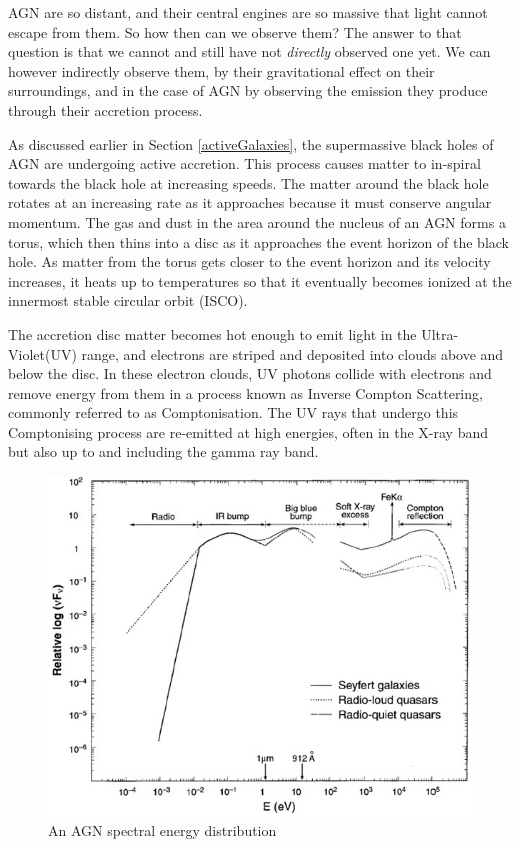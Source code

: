 \documentclass[12pt, oneside]{smuthesis}
\begin{document}
AGN are so distant, and their central engines are so massive that light cannot escape from them. So how then can we observe them? The answer to that question is that we cannot and still have not \textit{directly} observed one yet. We can however indirectly observe them, by their gravitational effect on their surroundings, and in the case of AGN by observing the emission they produce through their accretion process.

As discussed earlier in Section \ref{activeGalaxies}, the supermassive black holes of AGN are undergoing active accretion. This process causes matter to in-spiral towards the black hole at increasing speeds. The matter around the black hole rotates at an increasing rate as it approaches because it must conserve angular momentum. The gas and dust in the area around the nucleus of an AGN forms a torus, which then thins into a disc as it approaches the event horizon of the black hole. As matter from the torus gets closer to the event horizon and its velocity increases, it heats up to temperatures so that it eventually becomes ionized at the innermost stable circular orbit (ISCO).

The accretion disc matter becomes hot enough to emit light in the Ultra-Violet(UV) range, and electrons are striped and deposited into clouds above and below the disc. In these electron clouds, UV photons collide with electrons and remove energy from them in a process known as Inverse Compton Scattering, commonly referred to as Comptonisation. The UV rays that undergo this Comptonising process are re-emitted at high energies, often in the X-ray band but also up to and including the gamma ray band.

\begin{figure}[H]
	\centering
	\begin{minipage}{0.9\linewidth}
		\centering
		\includegraphics[width=\linewidth]{AGN-spectra}
		\caption{An AGN spectral energy distribution \citep{koratkar}}
		\label{fig:agn-continuum}
	\end{minipage}
\end{figure}
\end{document}
